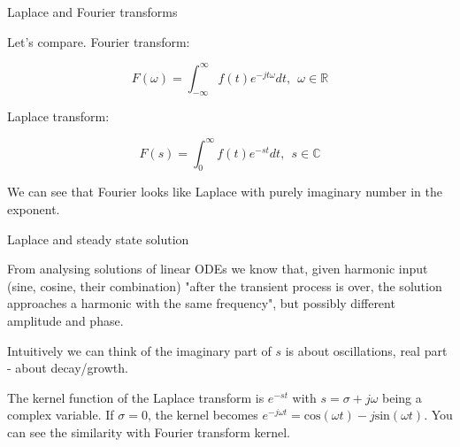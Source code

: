\documentclass{beamer}
\begin{document}
\begin{frame}{Laplace and Fourier transforms}
	\begin{flushleft}
		
		Let's compare. Fourier transform:
		
		\begin{equation}
			F(\omega) = \int_{-\infty}^\infty f(t) e^{-j t \omega} dt, \ \ \omega \in \mathbb{R}
		\end{equation}
		
		Laplace transform:
		
		\begin{equation}
			F(s) = \int_0^\infty f(t) e^{-st}dt, \ \ s \in \mathbb{C}
		\end{equation}
		
		We can see that Fourier looks like Laplace with purely imaginary number in the exponent.
		
	\end{flushleft}
\end{frame}



\begin{frame}{Laplace and steady state solution}
	\begin{flushleft}
		
		From analysing solutions of linear ODEs we know that, given harmonic input (sine, cosine, their combination) "after the transient process is over, the solution approaches a harmonic with the same frequency", but possibly different amplitude and phase.
		
		\bigskip
		
		Intuitively we can think of the imaginary part of $s$ is about oscillations, real part - about decay/growth. 
		
		\bigskip
		The kernel function of the Laplace transform is $e^{-st}$ with $s = \sigma + j \omega$ being a complex variable. If $\sigma = 0$, the kernel becomes $e^{-j \omega t} = \text{cos}(\omega t) - j \text{sin}(\omega t)$. You can see the similarity with Fourier transform kernel.
		
		
	\end{flushleft}
\end{frame}
\end{document}
